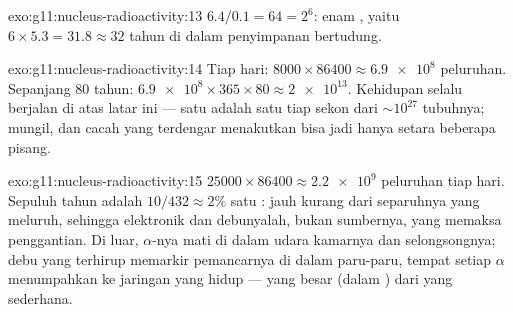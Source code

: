 \begin{solution}{exo:g11:nucleus-radioactivity:13}
$6.4/0.1 = 64 = 2^{6}$: enam , yaitu
$6 \times 5.3 = 31.8 \approx 32$ tahun di dalam penyimpanan bertudung.
\end{solution}

\begin{solution}{exo:g11:nucleus-radioactivity:14}
Tiap hari: $8000 \times 86400 \approx \num{6.9e8}$ peluruhan. Sepanjang $80$
tahun: $\num{6.9e8} \times 365 \times 80 \approx \num{2e13}$. Kehidupan
selalu berjalan di atas latar ini --- satu  adalah satu  tiap
sekon dari $\sim 10^{27}$  tubuhnya;  mungil, dan cacah
 yang terdengar menakutkan bisa jadi hanya setara beberapa pisang.
\end{solution}

\begin{solution}{exo:g11:nucleus-radioactivity:15}
$\num{25000} \times 86400 \approx \num{2.2e9}$ peluruhan tiap hari. Sepuluh
tahun adalah $10/432 \approx 2\%$ satu : jauh kurang dari
separuhnya yang meluruh, sehingga elektronik dan debunyalah, bukan
sumbernya, yang memaksa penggantian. Di luar, $\alpha$-nya mati di dalam
udara kamarnya dan selongsongnya; debu yang terhirup memarkir pemancarnya
di dalam paru-paru, tempat setiap $\alpha$ menumpahkan  ke jaringan
yang hidup ---  yang besar (dalam ) dari  yang
sederhana.
\end{solution}

